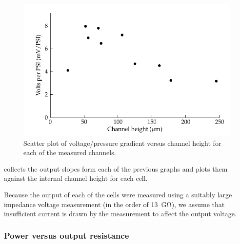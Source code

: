 \begin{figure}
    \centering
    \includegraphics{content/pt1/01-PowerHarvesting/graphics/streamingCell_slopeVsChannelHeight}
    \caption{\label{fig:streamingCell_scatter_voltGradVsHeight}Scatter plot of voltage/pressure gradient versus channel height for each of the measured channels.}
\end{figure}

 collects the output slopes form each of the previous graphs and plots them against the internal channel height for each cell.

Because the output of each of the cells were measured using a suitably large impedance voltage measurement (in the order of \SI{13}{\giga\ohm}), we assume that insufficient current is drawn by the measurement to affect the output voltage.



\subsubsection*{Power versus output resistance}






